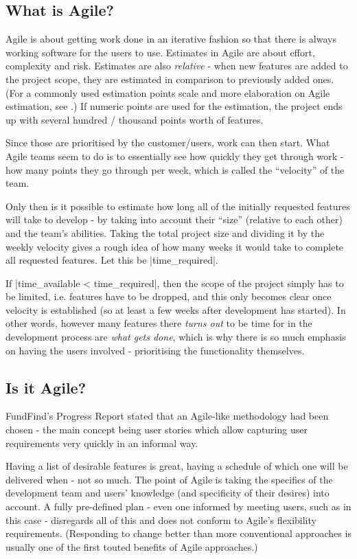 \subsection{What is Agile?}
Agile is about getting work done in an iterative fashion so that there is always working software for the users to use. Estimates in Agile are about effort, complexity and risk. Estimates are also \emph{relative} - when new features are added to the project scope, they are estimated in comparison to previously added ones. (For a commonly used estimation points scale and more elaboration on Agile estimation, see \cite{agile-estimate}.) If numeric points are used for the estimation, the project ends up with several hundred / thousand points worth of features.

Since those are prioritised by the customer/users, work can then start. What Agile teams seem to do is to essentially see how quickly they get through work - how many points they go through per week, which is called the ``velocity'' of the team.

Only then is it possible to estimate how long all of the initially requested features will take to develop - by taking into account their ``size'' (relative to each other) and the team's abilities. Taking the total project size and dividing it by the weekly velocity gives a rough idea of how many weeks it would take to complete all requested features. Let this be |time_required|.

If |time_available < time_required|, then the scope of the project simply has to be limited, i.e. features have to be dropped, and this only becomes clear once velocity is established (so at least a few weeks after development has started). In other words, however many features there \emph{turns out} to be time for in the development process are \emph{what gets done}, which is why there is so much emphasis on having the users involved - prioritising the functionality themselves.

\subsection{Is it Agile?}

FundFind's Progress Report \cite{progress-report} stated that an Agile-like methodology had been chosen - the main concept being user stories which allow capturing user requirements very quickly in an informal way.

Having a list of desirable features is great, having a schedule of which one will be delivered when - not so much. The point of Agile is taking the specifics of the development team and users' knowledge (and specificity of their desires) into account. A fully pre-defined plan - even one informed by meeting users, such as in this case - disregards all of this and does not conform to Agile's flexibility requirements. (Responding to change better than more conventional approaches is usually one of the first touted benefits of Agile approaches.) 

